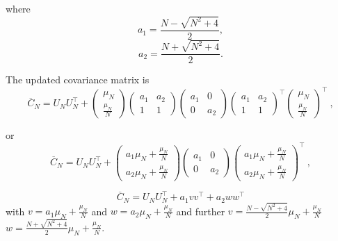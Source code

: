 \documentclass[onecolumn]{webofc}
\begin{document}
where
\begin{equation}
a_1=\frac{N-\sqrt{N^2+4}}{2},
\end{equation}
\begin{equation}
a_2=\frac{N+\sqrt{N^2+4}}{2}.
\end{equation}


The updated covariance matrix is 
\begin{equation}
\overline{C}_{N}=U_{N}U_{N}^{\top}+\begin{pmatrix}
\mu_{N} \\
\frac{\mu_{N}}{N}
\end{pmatrix}\begin{pmatrix}a_1 & a_2\\
1 & 1 
\end{pmatrix}\begin{pmatrix}a_1 & 0\\
0 & a_2 
\end{pmatrix}\begin{pmatrix}a_1 & a_2\\
1 & 1 
\end{pmatrix}^{\top}\begin{pmatrix}
\mu_{N} \\
\frac{\mu_{N}}{N}
\end{pmatrix}^{\top}\ ,
\end{equation}

or
\begin{equation}
\overline{C}_{N}=U_{N}U_{N}^{\top}+\begin{pmatrix}a_1 \mu_N +\frac{\mu_N}{N}\\
a_2 \mu_N +\frac{\mu_N}{N}
\end{pmatrix}\begin{pmatrix}a_1 & 0\\
0 & a_2 
\end{pmatrix}\begin{pmatrix}a_1 \mu_N +\frac{\mu_N}N\\
a_2 \mu_N +\frac{\mu_N}{N}
\end{pmatrix}^{\top}\ ,
\end{equation}

\begin{equation}
\overline{C}_{N}=U_{N}U_{N}^{\top}+a_1v v^{\top}+a_2w w^{\top}
\end{equation}
with $v=a_1 \mu_N +\frac{\mu_N}{N}$ and $w=a_2 \mu_N +\frac{\mu_N}{N}$ and further
$v= \frac{N-\sqrt{N^2+4}}{2}\mu_N +\frac{\mu_N}{N}$
$w=\frac{N+\sqrt{N^2+4}}{2} \mu_N +\frac{\mu_N}{N}$.
\end{document}
